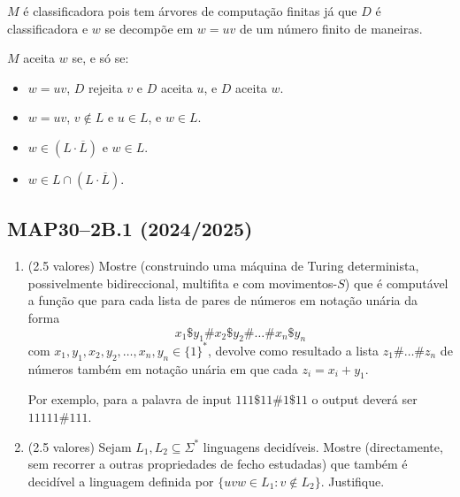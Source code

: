 \documentclass[a4paper,12pt]{article}
\begin{document}
\begin{enumerate}[label=\alph*)]
  $M$ é classificadora pois tem árvores de computação finitas já que $D$ é classificadora e $w$ se decompõe em $w=uv$ de um número finito de maneiras.
  
  $M$ aceita $w$ se, e só se:
  \begin{itemize}
      \item $w = uv$, $D$ rejeita $v$ e $D$ aceita $u$, e $D$ aceita $w$.
      \item $w = uv$, $v \notin L$ e $u \in L$, e $w \in L$.
      \item $w \in (L \cdot \overline{L})$ e $w \in L$.
      \item $w \in L \cap (L \cdot \overline{L})$.
  \end{itemize}
\end{enumerate}


\vspace{1.0cm}
\subsection*{MAP30–2B.1 (2024/2025)}
\begin{enumerate}[label=\alph*)]
  \item (2.5 valores) Mostre (construindo uma máquina de Turing determinista, possivelmente bidireccional, multifita e com movimentos-\(S\)) que é computável a função que para cada lista de pares de números em notação unária da forma
  \[x_1 \$ y_1 \# x_2 \$ y_2 \# \ldots \# x_n \$ y_n\]
  com \(x_1, y_1, x_2, y_2, \ldots, x_n, y_n \in \{1\}^*\), devolve como resultado a lista \(z_1 \# \ldots \# z_n\) de números também em notação unária em que cada \(z_i = x_i + y_1\).
  
  Por exemplo, para a palavra de input \(111\$11\#1\$11\) o output deverá ser \(11111\#111\).

  \item (2.5 valores) Sejam \(L_1, L_2 \subseteq \Sigma^*\) linguagens decidíveis. Mostre (directamente, sem recorrer a outras propriedades de fecho estudadas) que também é decidível a linguagem definida por \(\{uvw \in L_1 : v \notin L_2\}\). Justifique.
\end{enumerate}
\end{document}
